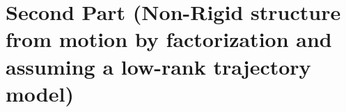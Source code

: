 \section{Second Part (Non-Rigid structure from motion by factorization and assuming a low-rank trajectory model)}